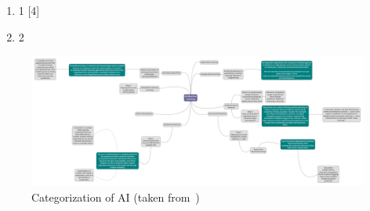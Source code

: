 \begin{enumerate}
 \item 1 [4]
 \item 2
\end{enumerate}


\begin{figure}[htbp]
  \centering
  \includegraphics[width=\textwidth]{images/ai-categorization}
  \caption{Categorization of \ac{AI} (taken from~\cite{})}
  \label{fig:ai-categorization}
\end{figure}

\endinput

Machine Learning has become a topic of interest because of its large field of application (deepen). Artificial intelligence is a broad area of knowledge comprised with several branches where each one has a different configuration and purpose. As a result, we consider one question: what field should a new user start working with if the goal is to classify information from a specific data set? Our work responds to this question based on empirical experimentation where we identified that approaching Machine Learning through supervised linear regression models allows users to understand the basic applications while fulfilling their objective. Moreover, due to available resources such as high level TensorFlow Estimator API and the column-oriented data analysis API Pandas learning doesn’t require long(subjective) before the user can start working on Machine Learning projects. 